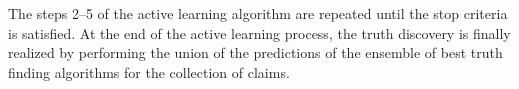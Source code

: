 The steps 2--5 of the active learning algorithm are repeated until the stop criteria is satisfied. 
At the end of the active learning process, the truth discovery is finally realized by performing 
the union of the predictions of the ensemble of best truth finding algorithms for the collection 
of claims. 

